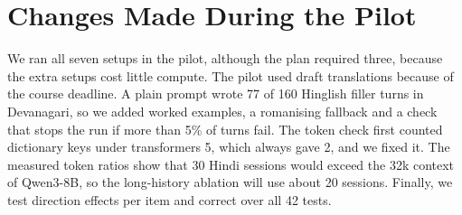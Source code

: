 \documentclass[11pt]{article}
\begin{document}
\section{Changes Made During the Pilot}
\label{app:dev}
We ran all seven setups in the pilot, although the plan required three, because the extra setups cost little compute.
The pilot used draft translations because of the course deadline.
A plain prompt wrote 77 of 160 Hinglish filler turns in Devanagari, so we added worked examples, a romanising fallback and a check that stops the run if more than 5\% of turns fail.
The token check first counted dictionary keys under transformers 5, which always gave 2, and we fixed it.
The measured token ratios show that 30 Hindi sessions would exceed the 32k context of Qwen3-8B, so the long-history ablation will use about 20 sessions.
Finally, we test direction effects per item and correct over all 42 tests.
\end{document}
